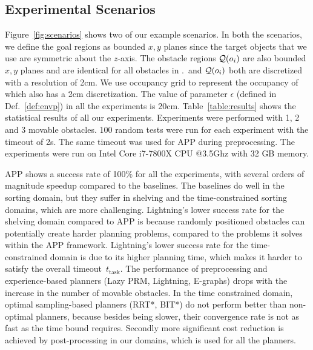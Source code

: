 \documentclass[a4paper]{report}
\begin{document}
\subsection{Experimental Scenarios}
Figure~\ref{fig:scenarios} shows two of our example scenarios. In both the scenarios, we define the goal regions \calG as bounded $x,y$ planes since the target objects that we use are symmetric about the $z$-axis. The obstacle regions $\mathcal{Q}(o_i)$ are also bounded $x,y$ planes and are identical for all obstacles in \calO.~\calG and $\mathcal{Q}(o_i)$ both are discretized with a resolution of 2cm. We use occupancy grid to represent the occupancy of \calW which also has a 2cm discretization. The value of parameter $\epsilon$ (defined in Def.~\ref{def:envp}) in all the experiments is 20cm.
%
%
Table~\ref{table:results} shows the statistical results of all our experiments. Experiments were performed with 1, 2 and 3 movable obstacles. 100 random tests were run for each experiment with the timeout of 2s. The same timeout was used for APP during preprocessing. The experiments were run on Intel Core i7-7800X CPU @3.5Ghz with 32 GB memory.

APP shows a success rate of 100\% for all the experiments, with several orders of magnitude speedup compared to the baselines. The baselines do well in the sorting domain, but they suffer in shelving and the time-constrained sorting domains, which are more challenging.
%
Lightning's lower success rate for the shelving domain compared to APP is because randomly positioned obstacles can potentially create harder planning problems, compared to the problems it solves within the APP framework.
%
Lightning's lower success rate for the time-constrained domain is due to its higher planning time, which makes it harder to satisfy the overall timeout~$t_\textrm{task}$.
%
%
The performance of preprocessing and experience-based planners (Lazy PRM, Lightning, E-graphs) drops with the increase in the number of movable obstacles.
%
In the time constrained domain, optimal sampling-based planners (RRT*, BIT*) do not perform better than non-optimal planners, because besides being slower, their convergence rate is not as fast as the time bound requires. Secondly more significant cost reduction is achieved by post-processing in our domains, which is used for all the planners.
\end{document}
